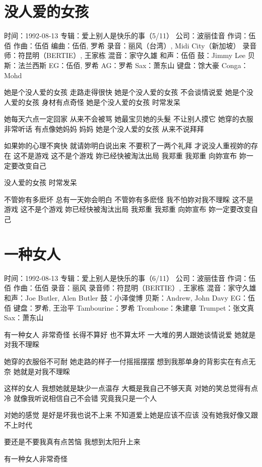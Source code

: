\documentclass[UTF8,a4paper,oneside,twocolumn,12pt]{ctexbook}
\newcommand{\infopair}[2]{\textbullet #1：#2}
\newcommand{\zc}[1][伍佰]{\infopair{作词}{#1}}
\newcommand{\zq}[1][伍佰]{\infopair{作曲}{#1}}
\newcommand{\bq}[1][伍佰]{\infopair{编曲}{#1}}
\newcommand{\zj}[1]{\infopair{专辑}{#1}}
\newcommand{\sj}[1]{\infopair{时间}{#1}}
\newcommand{\gs}[1]{\infopair{公司}{#1}}
\newenvironment{info}{\begin{flushleft}\kaishu
	}
	{\end{flushleft}\normalsize\yahei\par}
\newenvironment{lyric}{
	}
{}
\begin{document}
\section{没人爱的女孩}
\begin{info}
	\sj{1992-08-13}
	\zj{爱上别人是快乐的事（5/11）}
	\gs{波丽佳音}
	\zc
	\zq
	\bq[伍佰, 罗希]
	\infopair{录音}{丽风（台湾）, Midi City（新加坡）}
	\infopair{录音师}{符昆明（BERTIE）, 王家栋}
	\infopair{混音}{家守久雄}
	\infopair{和声}{伍佰}
	\infopair{鼓}{Jimmy Lee}
	\infopair{贝斯}{法兰西斯}
	\infopair{EG}{伍佰, 罗希}
	\infopair{AG}{罗希}
	\infopair{Sax}{萧东山}
	\infopair{键盘}{馀大豪}
	\infopair{Conga}{Mohd}
\end{info}
\begin{lyric}
	她是个没人爱的女孩 走路走得很快
	她是个没人爱的女孩 不会谈情说爱
	她是个没人爱的女孩 身材有点奇怪
	她是个没人爱的女孩 时常发呆

	她每天六点一定回家 从来不会被骂
	她最宝贝她的头髮   不让别人摸它
	她穿的衣服非常听话 有点像她妈妈  妈妈
	她是个没人爱的女孩 从来不说拜拜

	如果妳的心理不爽快 就请妳明白说出来
	不要积了一两个礼拜 才说没人重视妳的存在
	这不是游戏  这不是个游戏  妳已经快被淘汰出局
	我郑重  我郑重  向妳宣布  妳一定要改变自己

	没人爱的女孩  时常发呆

	不管妳有多麽坏  总有一天妳会明白
	不管妳有多麽怪  我不怕妳对我不理睬
	这不是游戏  这不是个游戏  妳已经快被淘汰出局
	我郑重  我郑重  向妳宣布  妳一定要改变自己
\end{lyric}

\section{一种女人}
\begin{info}
	\sj{1992-08-13}
	\zj{爱上别人是快乐的事（6/11）}
	\gs{波丽佳音}
	\zc
	\zq
	\infopair{录音}{丽风}
	\infopair{录音师}{符昆明（BERTIE）, 王家栋}
	\infopair{混音}{家守久雄}
	\infopair{和声}{Joe Butler, Alen Butler}
	\infopair{鼓}{小泽俊博}
	\infopair{贝斯}{Andrew, John Davy}
	\infopair{EG}{伍佰}
	\infopair{键盘}{罗希, 王治平}
	\infopair{Tambourine}{罗希}
	\infopair{Trombone}{朱建章}
	\infopair{Trumpet}{张文真}
	\infopair{Sax}{萧东山}
\end{info}
\begin{lyric}
	有一种女人   非常奇怪
	长得不算好   也不算太坏
	一大堆的男人跟她谈情说爱
	她就是对我不理睬

	她穿的衣服俗不可耐
	她走路的样子一付摇摇摆摆
	想到我那单身的背影实在有点无奈
	她就是对我不理睬

	这样的女人  我想她就是缺少一点温存
	大概是我自己不够天真
	对她的笑总觉得有点冷
	就像我听说相信自己不会错
	究竟我只是一个人

	对她的感觉  是好是坏我也说不上来
	不知道爱上她是应该不应该
	没有她我好像又跟不上时代

	要还是不要我真有点苦恼
	我想到太阳升上来

	有一种女人非常奇怪
\end{lyric}
\end{document}

